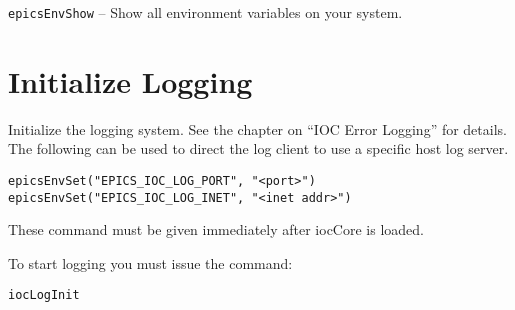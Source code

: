 \verb|epicsEnvShow| -- Show all environment variables on your system.

\section{Initialize Logging}

Initialize the logging system.
See the chapter on ``IOC Error Logging'' for details.
The following can be used to direct the log client to use a specific host log server.

\begin{verbatim}
epicsEnvSet("EPICS_IOC_LOG_PORT", "<port>")
epicsEnvSet("EPICS_IOC_LOG_INET", "<inet addr>")
\end{verbatim}

These command must be given immediately after iocCore is loaded.

To start logging you must issue the command:

\begin{verbatim}
iocLogInit
\end{verbatim}

